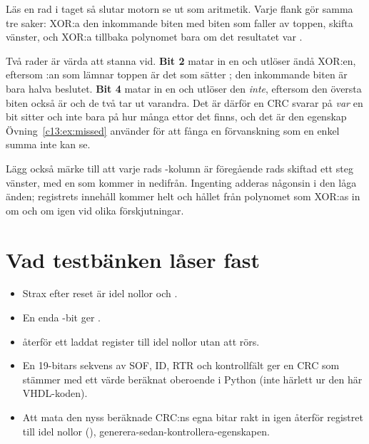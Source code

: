 Läs en rad i taget så slutar motorn se ut som aritmetik. Varje flank gör samma tre saker: XOR:a den
inkommande biten med biten som faller av toppen, skifta vänster, och XOR:a tillbaka polynomet bara om
det resultatet var .

Två rader är värda att stanna vid. \textbf{Bit 2} matar in en  och utlöser ändå XOR:en,
eftersom :an som lämnar toppen är det som sätter ; den inkommande biten är
bara halva beslutet. \textbf{Bit 4} matar in en  och utlöser den \emph{inte}, eftersom den
översta biten också är  och de två tar ut varandra. Det är därför en CRC svarar på \emph{var}
en bit sitter och inte bara på hur många ettor det finns, och det är den egenskap
Övning~\ref{c13:ex:missed} använder för att fånga en förvanskning som en enkel summa inte kan se.

Lägg också märke till att varje rads -kolumn är föregående rads  skiftad ett
steg vänster, med en  som kommer in nedifrån. Ingenting adderas någonsin i den låga änden;
registrets innehåll kommer helt och hållet från polynomet som XOR:as in om och om igen vid olika
förskjutningar.

\section{Vad testbänken låser fast}
\label{c13:sec:tb}

\begin{itemize}
  \item Strax efter reset är  idel nollor och .
  \item En enda -bit ger .
  \item {} återför ett laddat register till idel nollor utan att  rörs.
  \item En 19-bitars sekvens av SOF, ID, RTR och kontrollfält ger en CRC som stämmer med ett värde
    beräknat oberoende i Python (inte härlett ur den här VHDL-koden).
  \item Att mata den nyss beräknade CRC:ns egna bitar rakt in igen återför registret till idel nollor
    (), generera-sedan-kontrollera-egenskapen.
\end{itemize}

